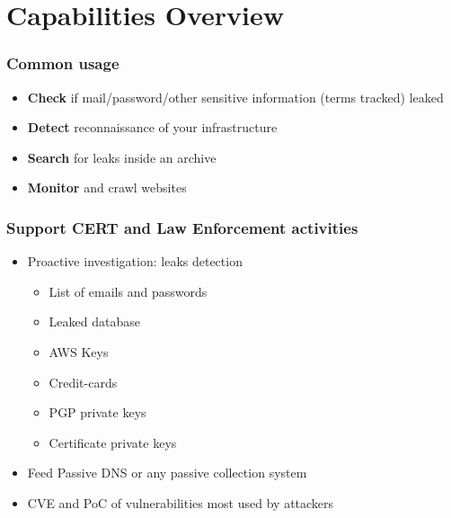 \documentclass{beamer}
\begin{document}
\section{Capabilities Overview}

\begin{frame}
    \frametitle{Common usage}
        \begin{itemize}
                \item {\bf Check} if mail/password/other sensitive information (terms tracked) leaked
                \item {\bf Detect} reconnaissance of your infrastructure
                \item {\bf Search} for leaks inside an archive
                \item {\bf Monitor} and crawl websites
        \end{itemize}
\end{frame}

\begin{frame}
    \frametitle{Support CERT and Law Enforcement activities}
        \begin{itemize}
            \item Proactive investigation: leaks detection
            \begin{itemize}
		        \item List of emails and passwords
		        \item Leaked database
		        \item AWS Keys
		        \item Credit-cards
		        \item PGP private keys
		        \item Certificate private keys
		    \end{itemize}
		    \item Feed Passive DNS or any passive collection system
		    \item CVE and PoC of vulnerabilities most used by attackers
		\end{itemize}
\end{frame}
\end{document}
